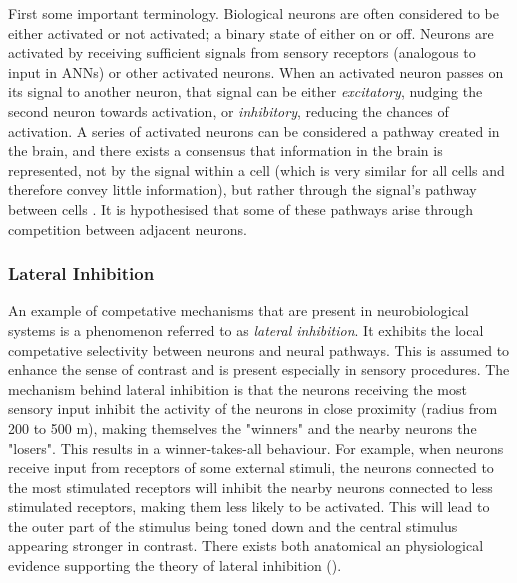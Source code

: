     First some important terminology. Biological neurons are often considered to be either activated or not activated; a binary state of either on or off. Neurons are activated by receiving sufficient signals from sensory receptors (analogous to input in ANNs) or other activated neurons. When an activated neuron passes on its signal to another neuron, that signal can be either \textit{excitatory}, nudging the second neuron towards activation, or \textit{inhibitory}, reducing the chances of activation.  A series of activated neurons can be considered a pathway created in the brain, and there exists a consensus that information in the brain is represented, not by the signal within a cell (which is very similar for all cells and therefore convey little information), but rather through the signal's pathway between cells . It is hypothesised that some of these pathways arise through competition between adjacent neurons. 
    
    \subsubsection{Lateral Inhibition}

        An example of competative mechanisms that are present in neurobiological systems is a phenomenon referred to as \textit{lateral inhibition}. It exhibits the local competative selectivity between neurons and neural pathways. This is assumed to enhance the sense of contrast and is present especially in sensory procedures. The mechanism behind lateral inhibition is that the neurons receiving the most sensory input inhibit the activity of the neurons in close proximity (radius from 200 to 500 \textmu m), making themselves the "winners" and the nearby neurons the "losers". This results in a winner-takes-all behaviour. For example, when neurons receive input from receptors of some external stimuli, the neurons connected to the most stimulated receptors will inhibit the nearby neurons connected to less stimulated receptors, making them less likely to be activated. This will lead to the outer part of the stimulus being toned down and the central stimulus appearing stronger in contrast.
         There exists both anatomical an physiological evidence supporting the theory of lateral inhibition (). 

